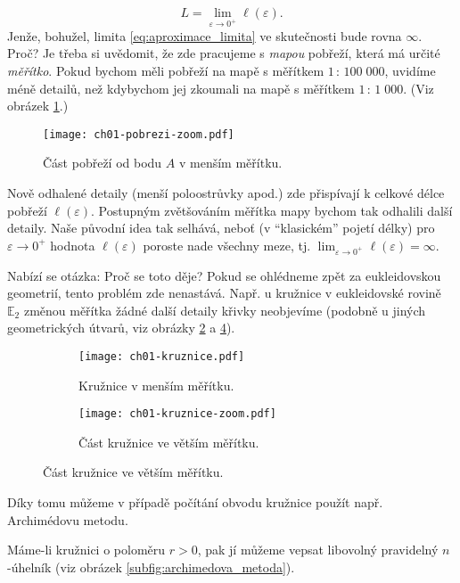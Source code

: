 \begin{equation}\label{eq:aproximace_limita}
    L=\lim_{\varepsilon\to0^+}{\ell(\varepsilon)}.
\end{equation}
Jenže, bohužel, limita \eqref{eq:aproximace_limita} ve skutečnosti bude rovna $\infty$. Proč? Je třeba si uvědomit, že zde pracujeme s \emph{mapou} pobřeží, která má určité \emph{měřítko}. Pokud bychom měli pobřeží na mapě s měřítkem $1\,:\,100\;000$, uvidíme méně detailů, než kdybychom jej zkoumali na mapě s měřítkem $1\,:\,1\;000$. (Viz obrázek \ref{fig:pobrezi_zoom}.)\par
\begin{figure}[h]
    \centering
    \texttt{[image: ch01-pobrezi-zoom.pdf]}
    \caption{Část pobřeží od bodu $A$ v menším měřítku.}
    \label{fig:pobrezi_zoom}
\end{figure}
Nově odhalené detaily (menší poloostrůvky apod.) zde přispívají k celkové délce pobřeží $\ell(\varepsilon)$. Postupným zvětšováním měřítka mapy bychom tak odhalili další detaily. Naše původní idea tak selhává, neboť (v ``klasickém'' pojetí délky) pro $\varepsilon\to0^+$ hodnota $\ell(\varepsilon)$ poroste nade všechny meze, tj. $\lim_{\varepsilon\to0^+}{\ell(\varepsilon)}=\infty$.\par
Nabízí se otázka: Proč se toto děje? Pokud se ohlédneme zpět za eukleidovskou geometrií, tento problém zde nenastává. Např. u kružnice v eukleidovské rovině $\mathbb{E}_2$ změnou měřítka žádné další detaily křivky neobjevíme (podobně u jiných geometrických útvarů, viz obrázky \ref{subfig:kruznice} a \ref{subfig:kruznice_zoom}). 
\begin{figure}[h]
    \centering
    \begin{subfigure}{\subfigwidth}
        \centering
        \texttt{[image: ch01-kruznice.pdf]}
        \caption{Kružnice v menším měřítku.}
        \label{subfig:kruznice}
    \end{subfigure}
    \quad
    \begin{subfigure}{\subfigwidth}
        \centering
        \texttt{[image: ch01-kruznice-zoom.pdf]}
        \caption{Část kružnice ve větším měřítku.}
        \label{subfig:kruznice_zoom}
    \end{subfigure}
\end{figure}
Díky tomu můžeme v případě počítání obvodu kružnice použít např. Archimédovu metodu.\par
Máme-li kružnici o poloměru $r>0$, pak jí můžeme vepsat libovolný pravidelný $n$-úhelník (viz obrázek \ref{subfig:archimedova_metoda}).
